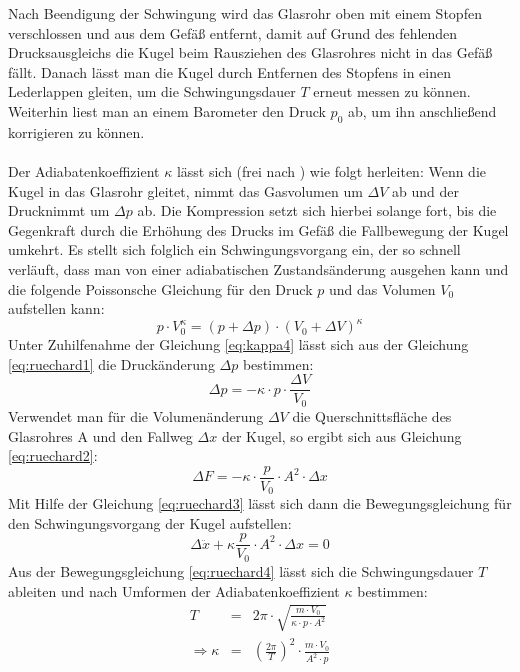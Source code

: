 \documentclass[a4paper,titlepage]{scrartcl}
\numberwithin{equation}{section}
\begin{document}
Nach Beendigung der Schwingung wird das Glasrohr oben mit einem Stopfen verschlossen und aus dem Gefäß entfernt, damit auf Grund des fehlenden Drucksausgleichs die Kugel beim Rausziehen des Glasrohres nicht in das Gefäß fällt. Danach lässt man die Kugel durch Entfernen des Stopfens in einen Lederlappen gleiten, um die Schwingungsdauer $T$ erneut messen zu können.\\
Weiterhin liest man an einem Barometer den Druck $p_0$ ab, um ihn anschließend korrigieren zu können.\\\\
Der Adiabatenkoeffizient $\kappa$ lässt sich (frei nach \cite{walcher}) wie folgt herleiten:
Wenn die Kugel in das Glasrohr gleitet, nimmt das Gasvolumen um $\Delta V$ ab und der Drucknimmt um $\Delta p$ ab. Die Kompression setzt sich hierbei solange fort, bis die Gegenkraft durch die Erhöhung des Drucks im Gefäß die Fallbewegung der Kugel umkehrt. Es stellt sich folglich ein Schwingungsvorgang ein, der so schnell verläuft, dass man von einer adiabatischen Zustandsänderung ausgehen kann und die folgende Poissonsche Gleichung für den Druck $p$ und das Volumen $V_0$ aufstellen kann:
\begin{equation}
\label{eq:ruechard1}
p \cdot V_0^{\kappa}=(p + \Delta p) \cdot (V_0 + \Delta V)^\kappa
\end{equation}
Unter Zuhilfenahme der Gleichung \ref{eq:kappa4} lässt sich aus der Gleichung \ref{eq:ruechard1} die Druckänderung $\Delta p$ bestimmen:
\begin{equation}
\label{eq:ruechard2}
\Delta p = - \kappa \cdot p \cdot \frac{\Delta V}{V_0}
\end{equation}
Verwendet man für die Volumenänderung $\Delta V$ die Querschnittsfläche des Glasrohres A und den Fallweg $\Delta x$ der Kugel, so ergibt sich aus Gleichung \ref{eq:ruechard2}:
\begin{equation}
\label{eq:ruechard3}
\Delta F = - \kappa \cdot \frac{p}{V_0} \cdot A^2 \cdot \Delta x
\end{equation}
Mit Hilfe der Gleichung \ref{eq:ruechard3} lässt sich dann die Bewegungsgleichung für den Schwingungsvorgang der Kugel aufstellen:
\begin{equation}
\label{eq:ruechard4}
\Delta \ddot{x} + \kappa \frac{p}{V_0} \cdot A^2 \cdot \Delta x = 0
\end{equation}
Aus der Bewegungsgleichung \ref{eq:ruechard4} lässt sich die Schwingungsdauer $T$ ableiten und nach Umformen der Adiabatenkoeffizient $\kappa$ bestimmen:
\begin{eqnarray*}
T&=&2 \pi \cdot \sqrt{\frac{m \cdot V_0}{\kappa \cdot p \cdot A^2}}\\
\Rightarrow \kappa &=& \left(\frac{2 \pi}{T}\right)^2 \cdot \frac{m \cdot V_0}{A^2 \cdot p}
\end{eqnarray*}
\end{document}
